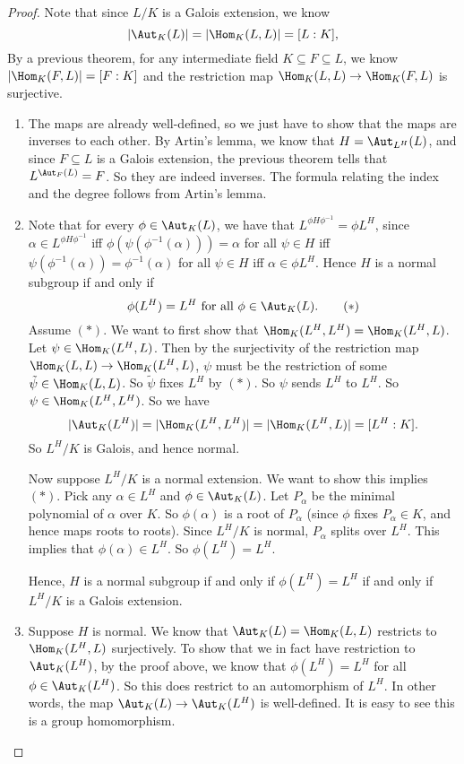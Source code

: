 \documentclass[a4paper]{article}
\begin{document}
\begin{proof}\leavevmode
  Note that since $L/K$ is a Galois extension, we know
  \[
    |\Aut_K(L)| = |\Hom_K(L, L)| = [L:K],
  \]
  By a previous theorem, for any intermediate field $K\subseteq F \subseteq L$, we know $|\Hom_K(F, L)| = [F:K]$ and the restriction map $\Hom_K(L, L) \to \Hom_K(F, L)$ is surjective.

  \begin{enumerate}
    \item The maps are already well-defined, so we just have to show that the maps are inverses to each other. By Artin's lemma, we know that $H = \Aut_{L^H}(L)$, and since $F\subseteq L$ is a Galois extension, the previous theorem tells that $L^{\Aut_F (L)} = F$. So they are indeed inverses. The formula relating the index and the degree follows from Artin's lemma.

    \item Note that for every $\phi \in \Aut_K(L)$, we have that $L^{\phi H \phi^{-1}} = \phi L^H$, since $\alpha \in L^{\phi H \phi^{-1}}$ iff $\phi (\psi (\phi^{-1} (\alpha))) = \alpha$ for all $\psi \in H$ iff $\psi (\phi^{-1}(\alpha)) = \phi^{-1}(\alpha)$ for all $\psi \in H$ iff $\alpha \in \phi L^H$. Hence $H$ is a normal subgroup if and only if
      \[
        \phi(L^H) = L^H\text{ for all }\phi \in \Aut_K(L).\tag{$*$}
      \]
      Assume $(*)$. We want to first show that $\Hom_K(L^H, L^H) = \Hom_K(L^H, L)$. Let $\psi \in \Hom_K(L^H, L)$. Then by the surjectivity of the restriction map $\Hom_K(L, L) \to \Hom_K(L^H, L)$, $\psi$ must be the restriction of some $\tilde{\psi} \in \Hom_K(L, L)$. So $\tilde{\psi}$ fixes $L^H$ by $(*)$. So $\psi$ sends $L^H$ to $L^H$. So $\psi \in \Hom_K(L^H, L^H)$. So we have
      \[
        |\Aut_K(L^H)| = |\Hom_K(L^H, L^H)| = |\Hom_K(L^H, L)| = [L^H:K].
      \]
      So $L^H/K$ is Galois, and hence normal.

      Now suppose $L^H/K$ is a normal extension. We want to show this implies $(*)$. Pick any $\alpha \in L^H$ and $\phi\in \Aut_K(L)$. Let $P_\alpha$ be the minimal polynomial of $\alpha$ over $K$. So $\phi(\alpha)$ is a root of $P_\alpha$ (since $\phi$ fixes $P_\alpha \in K$, and hence maps roots to roots). Since $L^H/K$ is normal, $P_\alpha$ splits over $L^H$. This implies that $\phi(\alpha) \in L^H$. So $\phi(L^H) = L^H$.

      Hence, $H$ is a normal subgroup if and only if $\phi(L^H) = L^H$ if and only if $L^H/K$ is a Galois extension.
    \item Suppose $H$ is normal. We know that $\Aut_K(L) = \Hom_K(L, L)$ restricts to $\Hom_K(L^H, L)$ surjectively. To show that we in fact have restriction to $\Aut_K(L^H)$, by the proof above, we know that $\phi(L^H) = L^H$ for all $\phi \in \Aut_K(L^H)$. So this does restrict to an automorphism of $L^H$. In other words, the map $\Aut_K(L) \to \Aut_K(L^H)$ is well-defined. It is easy to see this is a group homomorphism.


\end{enumerate}
\end{proof}
\end{document}
